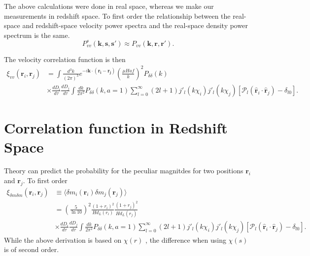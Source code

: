\documentclass[11pt, oneside]{article}   	%
\begin{document}
The above calculations were done in real space, whereas we make our measurements in redshift space.  To first order
the relationship between the real-space and redshift-space velocity
power spectra and the real-space density power spectrum is the same.
\begin{equation}
P^s_{vv}(\mathbf{k}, \mathbf{s}, \mathbf{s'}) \approx P_{vv}(\mathbf{k}, \mathbf{r}, \mathbf{r'}) .
\end{equation}

The  velocity correlation function is then
\begin{align}
\xi_{v v}(\mathbf{r}_i,\mathbf{r}_j)  & = \int \frac{d^3k}{(2\pi)^3} e^{-i \mathbf{k}\cdot (\mathbf{r_i}-\mathbf{r_j})}  \left( \frac{\mu Haf}{k}\right) ^2 P_{\delta \delta}(k)\\
& \times \frac{dD_i}{d\tau} \frac{dD_j}{d\tau} \int \frac{dk}{2\pi^2} P_{\delta \delta}(k,a=1)\sum_{l=0}^{\infty} (2l+1) j'_l(k\chi_i) j'_l(k\chi_j)
[\mathcal{P}_l(\mathbf{\hat{r}}_i \cdot \mathbf{\hat{r}}_j) - \delta_{l0}].
\end{align}

\section{Correlation function in Redshift Space}
Theory can predict the probability for the peculiar magnitdes for two positions
$\mathbf{r}_i$ and $\mathbf{r}_j$.  To first order 
\begin{align}
\xi_{\delta m \delta m}(\mathbf{r}_i,\mathbf{r}_j)  & \equiv  \langle \delta m_i(\mathbf{r}_i) \delta m_j(\mathbf{r}_j) \rangle\\
& =  \left( \frac{5}{\ln{10}}\right)^2 \frac{(1+r_i)^2}{Hd_L(r_i)} \frac{(1+r_j)^2}{Hd_L(r_j)}  \nonumber \\
& \times \frac{dD_i}{d\tau} \frac{dD_j}{d\tau} \int \frac{dk}{2\pi^2} P_{\delta \delta}(k,a=1)\sum_{l=0}^{\infty} (2l+1) j'_l(k\chi_i) j'_l(k\chi_j)
[\mathcal{P}_l(\mathbf{\hat{r}}_i \cdot \mathbf{\hat{r}}_j) - \delta_{l0}].
\end{align}
While the above derivation is based on $\chi(r)$ , the difference when using 
 $\chi(s)$  is of second order.
\end{document}
